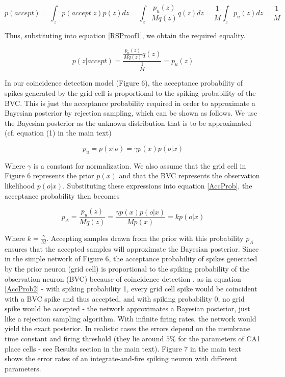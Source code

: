 \begin{equation}\label{RSProof3}
p(accept)=\int_z{p(accept|z)p(z)dz}=\int_z{\frac{p_u(z)}{Mq(z)} q(z) dz}=\frac{1}{M}\int_z{p_u(z) dz}=\frac{1}{M}
\end{equation}

Thus, substituting into equation \eqref{RSProof1}, we obtain the required equality.

\begin{equation}\label{RSProof2}
p(z|accept)=\frac{\frac{p_u(z)}{Mq(z)}q(z)}{\frac{1}{M}}=p_u(z)
\end{equation}

In our coincidence detection model (Figure 6), the acceptance probability of spikes generated by the grid cell is proportional to the spiking probability of the BVC. This is just the acceptance probability required in order to approximate a Bayesian posterior by rejection sampling, which can be shown as follows. We use the Bayesian posterior as the unknown distribution that is to be approximated (cf. equation (1) in the main text)

\begin{equation}\label{Papprox}
p_u = p(x|o) = \gamma p(x) p(o|x)
\end{equation}

Where $\gamma$ is a constant for normalization. We also assume that the grid cell in Figure 6 represents the prior $p(x)$ and that the BVC represents the observation likelihood $ p(o|x) $. Substituting these expressions into equation \eqref{AccProb}, the acceptance probability then becomes

\begin{equation}\label{AccProb2}
p_A=\frac{p_u(z)}{Mq(z)}=\frac{\gamma p(x) p(o|x)}{Mp(x)}=k p(o|x)
\end{equation}

Where $k=\frac{\gamma}{M}$. Accepting samples drawn from the prior with this probability $ p_A $ ensures that the accepted samples will approximate the Bayesian posterior. Since in the simple network of Figure 6, the acceptance probability of spikes generated by the prior neuron (grid cell) is proportional to the spiking probability of the observation neuron (BVC) because of coincidence detection \citep{Rossant2011}, as in equation \eqref{AccProb2} - with spiking probability 1, every grid cell spike would be coincident with a BVC spike and thus accepted, and with spiking probability 0, no grid spike would be accepted - the network approximates a Bayesian posterior, just like a rejection sampling algorithm. With infinite firing rates, the network would yield the exact posterior. In realistic cases the errors depend on the membrane time constant and firing threshold (they lie around $5\%$ for the parameters of CA1 place cells - see Results section in the main text). Figure 7 in the main text shows the error rates of an integrate-and-fire spiking neuron with different parameters.

